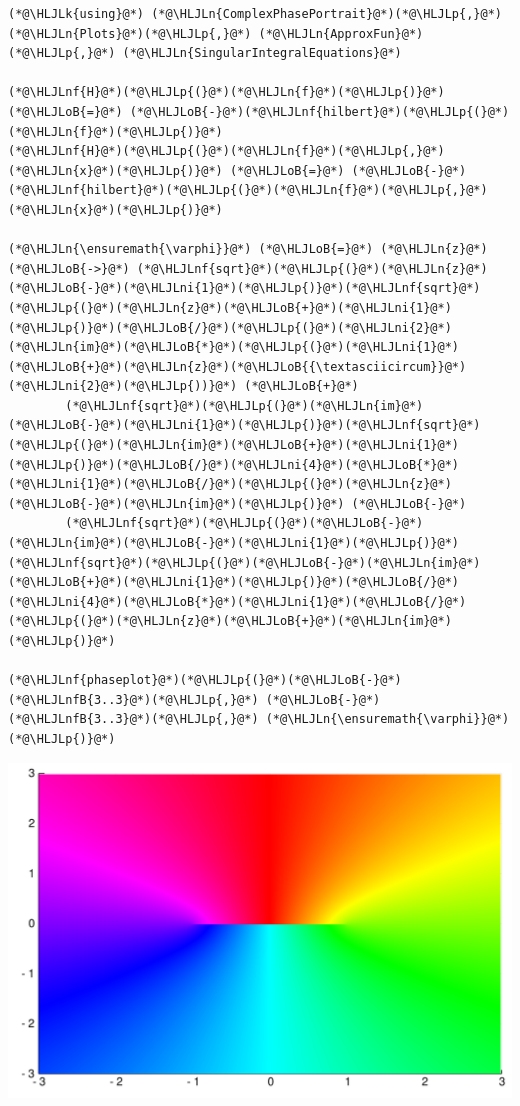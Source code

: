 \documentclass[12pt,a4paper]{article}
\newcommand{\HLJLk}[1]{\textcolor[RGB]{148,91,176}{\textbf{#1}}}
\newcommand{\HLJLn}[1]{#1}
\newcommand{\HLJLnf}[1]{\textcolor[RGB]{66,102,213}{#1}}
\newcommand{\HLJLnfB}[1]{\textcolor[RGB]{59,151,46}{#1}}
\newcommand{\HLJLni}[1]{\textcolor[RGB]{59,151,46}{#1}}
\newcommand{\HLJLoB}[1]{\textcolor[RGB]{102,102,102}{\textbf{#1}}}
\newcommand{\HLJLp}[1]{#1}
\begin{document}
\begin{lstlisting}
(*@\HLJLk{using}@*) (*@\HLJLn{ComplexPhasePortrait}@*)(*@\HLJLp{,}@*) (*@\HLJLn{Plots}@*)(*@\HLJLp{,}@*) (*@\HLJLn{ApproxFun}@*)(*@\HLJLp{,}@*) (*@\HLJLn{SingularIntegralEquations}@*)

(*@\HLJLnf{H}@*)(*@\HLJLp{(}@*)(*@\HLJLn{f}@*)(*@\HLJLp{)}@*) (*@\HLJLoB{=}@*) (*@\HLJLoB{-}@*)(*@\HLJLnf{hilbert}@*)(*@\HLJLp{(}@*)(*@\HLJLn{f}@*)(*@\HLJLp{)}@*)
(*@\HLJLnf{H}@*)(*@\HLJLp{(}@*)(*@\HLJLn{f}@*)(*@\HLJLp{,}@*)(*@\HLJLn{x}@*)(*@\HLJLp{)}@*) (*@\HLJLoB{=}@*) (*@\HLJLoB{-}@*)(*@\HLJLnf{hilbert}@*)(*@\HLJLp{(}@*)(*@\HLJLn{f}@*)(*@\HLJLp{,}@*)(*@\HLJLn{x}@*)(*@\HLJLp{)}@*)

(*@\HLJLn{\ensuremath{\varphi}}@*) (*@\HLJLoB{=}@*) (*@\HLJLn{z}@*) (*@\HLJLoB{->}@*) (*@\HLJLnf{sqrt}@*)(*@\HLJLp{(}@*)(*@\HLJLn{z}@*)(*@\HLJLoB{-}@*)(*@\HLJLni{1}@*)(*@\HLJLp{)}@*)(*@\HLJLnf{sqrt}@*)(*@\HLJLp{(}@*)(*@\HLJLn{z}@*)(*@\HLJLoB{+}@*)(*@\HLJLni{1}@*)(*@\HLJLp{)}@*)(*@\HLJLoB{/}@*)(*@\HLJLp{(}@*)(*@\HLJLni{2}@*)(*@\HLJLn{im}@*)(*@\HLJLoB{*}@*)(*@\HLJLp{(}@*)(*@\HLJLni{1}@*)(*@\HLJLoB{+}@*)(*@\HLJLn{z}@*)(*@\HLJLoB{{\textasciicircum}}@*)(*@\HLJLni{2}@*)(*@\HLJLp{))}@*) (*@\HLJLoB{+}@*) 
        (*@\HLJLnf{sqrt}@*)(*@\HLJLp{(}@*)(*@\HLJLn{im}@*)(*@\HLJLoB{-}@*)(*@\HLJLni{1}@*)(*@\HLJLp{)}@*)(*@\HLJLnf{sqrt}@*)(*@\HLJLp{(}@*)(*@\HLJLn{im}@*)(*@\HLJLoB{+}@*)(*@\HLJLni{1}@*)(*@\HLJLp{)}@*)(*@\HLJLoB{/}@*)(*@\HLJLni{4}@*)(*@\HLJLoB{*}@*)(*@\HLJLni{1}@*)(*@\HLJLoB{/}@*)(*@\HLJLp{(}@*)(*@\HLJLn{z}@*)(*@\HLJLoB{-}@*)(*@\HLJLn{im}@*)(*@\HLJLp{)}@*) (*@\HLJLoB{-}@*) 
        (*@\HLJLnf{sqrt}@*)(*@\HLJLp{(}@*)(*@\HLJLoB{-}@*)(*@\HLJLn{im}@*)(*@\HLJLoB{-}@*)(*@\HLJLni{1}@*)(*@\HLJLp{)}@*)(*@\HLJLnf{sqrt}@*)(*@\HLJLp{(}@*)(*@\HLJLoB{-}@*)(*@\HLJLn{im}@*)(*@\HLJLoB{+}@*)(*@\HLJLni{1}@*)(*@\HLJLp{)}@*)(*@\HLJLoB{/}@*)(*@\HLJLni{4}@*)(*@\HLJLoB{*}@*)(*@\HLJLni{1}@*)(*@\HLJLoB{/}@*)(*@\HLJLp{(}@*)(*@\HLJLn{z}@*)(*@\HLJLoB{+}@*)(*@\HLJLn{im}@*)(*@\HLJLp{)}@*)

(*@\HLJLnf{phaseplot}@*)(*@\HLJLp{(}@*)(*@\HLJLoB{-}@*)(*@\HLJLnfB{3..3}@*)(*@\HLJLp{,}@*) (*@\HLJLoB{-}@*)(*@\HLJLnfB{3..3}@*)(*@\HLJLp{,}@*) (*@\HLJLn{\ensuremath{\varphi}}@*)(*@\HLJLp{)}@*)
\end{lstlisting}

\includegraphics[width=\linewidth]{figures/Solutions2_1_1.pdf}
\end{document}
